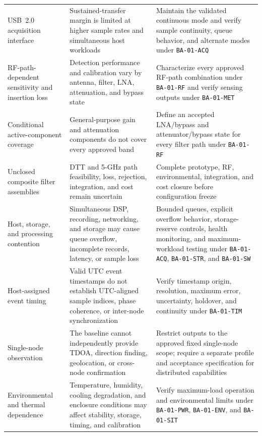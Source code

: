 \documentclass[11pt,a4paper]{article}
\begin{document}
\begin{longtable}{
			>{\raggedright\arraybackslash}p{3.0cm}
			>{\raggedright\arraybackslash}p{5.7cm}
			>{\raggedright\arraybackslash}p{5.0cm}}
		USB~2.0 acquisition interface &
		Sustained-transfer margin is limited at higher sample rates and
		simultaneous host workloads &
		Maintain the validated continuous mode and verify sample continuity,
		queue behavior, and alternate modes under \texttt{BA-01-ACQ} \\
		
		RF-path-dependent sensitivity and insertion loss &
		Detection performance and calibration vary by antenna, filter, LNA,
		attenuation, and bypass state &
		Characterize every approved RF-path combination under
		\texttt{BA-01-RF} and verify sensing outputs under
		\texttt{BA-01-MET} \\
		
		Conditional active-component coverage &
		General-purpose gain and attenuation components do not cover every
		approved band &
		Define an accepted LNA/bypass and attenuator/bypass state for every
		filter path under \texttt{BA-01-RF} \\
		
		Unclosed composite filter assemblies &
		DTT and 5-GHz path feasibility, loss, rejection, integration, and cost
		remain uncertain &
		Complete prototype, RF, environmental, integration, and cost closure
		before configuration freeze \\
		
		Host, storage, and processing contention &
		Simultaneous DSP, recording, networking, and storage may cause queue
		overflow, incomplete records, latency, or sample loss &
		Bounded queues, explicit overflow behavior, storage-reserve controls,
		health monitoring, and maximum-workload testing under
		\texttt{BA-01-ACQ}, \texttt{BA-01-STR}, and \texttt{BA-01-SW} \\
		
		Host-assigned event timing &
		Valid UTC event timestamps do not establish UTC-aligned sample indices,
		phase coherence, or inter-node synchronization &
		Verify timestamp origin, resolution, maximum error, uncertainty,
		holdover, and continuity under \texttt{BA-01-TIM} \\
		
		Single-node observation &
		The baseline cannot independently provide TDOA, direction finding,
		geolocation, or cross-node confirmation &
		Restrict outputs to the approved fixed single-node scope; require a
		separate profile and acceptance specification for distributed
		capabilities \\
		
		Environmental and thermal dependence &
		Temperature, humidity, cooling degradation, and enclosure conditions
		may affect stability, storage, timing, and calibration &
		Verify maximum-load operation and environmental limits under
		\texttt{BA-01-PWR}, \texttt{BA-01-ENV}, and \texttt{BA-01-SIT} \\
		

\end{longtable}
\end{document}
